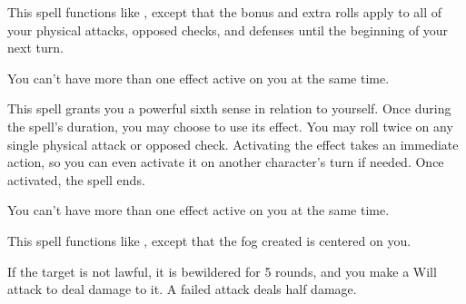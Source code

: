 \begin{spelleffect}
  This spell functions like , except that the bonus and extra rolls apply to all of your physical attacks, opposed checks, and defenses until the beginning of your next turn.
\end{spelleffect}
\begin{spellnotes}
  You can't have more than one  effect active on you at the same time.
\end{spellnotes}

\begin{spelleffect}
  This spell grants you a powerful sixth sense in relation to yourself. Once during the spell's duration, you may choose to use its effect. You may roll twice on any single physical attack or opposed check. Activating the effect takes an immediate action, so you can even activate it on another character's turn if needed. Once activated, the spell ends.
\end{spelleffect}
\begin{spellnotes}
  You can't have more than one  effect active on you at the same time.
\end{spellnotes}

\begin{comment}
\subsubsection{O-P}
\end{comment}

\begin{spelleffect}
  This spell functions like , except that the fog created is centered on you.
\end{spelleffect}

\spellrng{\rngmed}
\begin{spelleffect}
    If the target is not lawful, it is bewildered for 5 rounds, and you make a Will attack to deal damage to it. A failed attack deals half damage.
\end{spelleffect}

